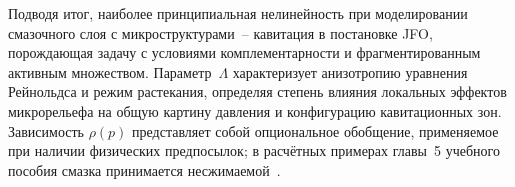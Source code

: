 Подводя итог, наиболее принципиальная нелинейность при
моделировании смазочного слоя с микроструктурами~-- кавитация
в постановке JFO, порождающая задачу с условиями
комплементарности и фрагментированным активным множеством.
Параметр~$\Lambda$ характеризует анизотропию уравнения
Рейнольдса и режим растекания, определяя степень влияния
локальных эффектов микрорельефа на общую картину давления
и конфигурацию кавитационных зон. Зависимость $\rho(p)$
представляет собой опциональное обобщение, применяемое при
наличии физических предпосылок; в расчётных примерах главы~5
учебного пособия смазка принимается несжимаемой~\cite{jang2002,rebufa2017}.

